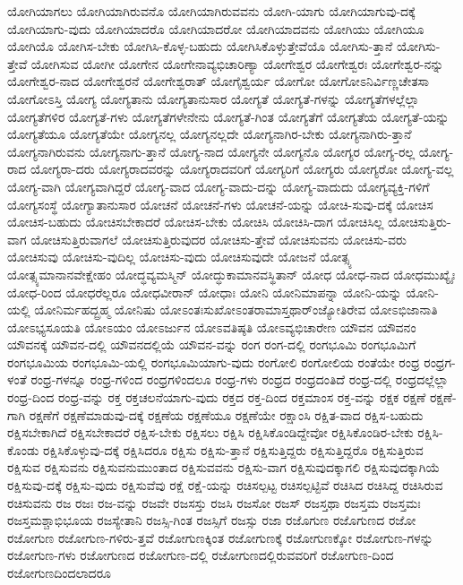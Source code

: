 {ಯೋಗಿಯಾಗಲು
ಯೋಗಿಯಾಗಿರುವನೊ
ಯೋಗಿಯಾಗಿರುವವನು
ಯೋಗಿ-ಯಾಗು
ಯೋಗಿಯಾಗುವು-ದಕ್ಕೆ
ಯೋಗಿಯಾಗು-ವುದು
ಯೋಗಿಯಾದರೊ
ಯೋಗಿಯಾದರೋ
ಯೋಗಿಯಾದವನು
ಯೋಗಿಯು
ಯೋಗಿಯೂ
ಯೋಗಿಯೊ
ಯೋಗಿಸ-ಬೇಕು
ಯೋಗಿಸಿ-ಕೊಳ್ಳ-ಬಹುದು
ಯೋಗಿಸಿಕೊಳ್ಳುತ್ತೇವೆಯೊ
ಯೋಗಿಸು-ತ್ತಾನೆ
ಯೋಗಿಸು-ತ್ತೇವೆ
ಯೋಗಿಸುವ
ಯೋಗೀ
ಯೋಗೇನ
ಯೋಗೇನಾವ್ಯಭಿಚಾರಿಣ್ಯಾ
ಯೋಗೇಶ್ವರ
ಯೋಗೇಶ್ವರಃ
ಯೋಗೇಶ್ವರ-ನನ್ನು
ಯೋಗೇಶ್ವರ-ನಾದ
ಯೋಗೇಶ್ವರನೆ
ಯೋಗೇಶ್ವರಾತ್
ಯೋಗೈಶ್ವರ್ಯ
ಯೋಗೋ
ಯೋಗೋಽನಿರ್ವಿಣ್ಣಚೇತಸಾ
ಯೋಗೋಽಸ್ತಿ
ಯೋಗ್ಯ
ಯೋಗ್ಯತಾನು
ಯೋಗ್ಯತಾನುಸಾರ
ಯೋಗ್ಯತೆ
ಯೋಗ್ಯತೆ-ಗಳನ್ನು
ಯೋಗ್ಯತೆಗಳಲ್ಲೆಲ್ಲಾ
ಯೋಗ್ಯತೆಗಳಿರ
ಯೋಗ್ಯತೆ-ಗಳು
ಯೋಗ್ಯತೆಗಳೇನೇನು
ಯೋಗ್ಯತೆ-ಗಿಂತ
ಯೋಗ್ಯತೆಗೆ
ಯೋಗ್ಯತೆಯ
ಯೋಗ್ಯತೆ-ಯನ್ನು
ಯೋಗ್ಯತೆಯೂ
ಯೋಗ್ಯತೆಯೇ
ಯೋಗ್ಯನಲ್ಲ
ಯೋಗ್ಯನಲ್ಲದೇ
ಯೋಗ್ಯನಾಗಿರ-ಬೇಕು
ಯೋಗ್ಯನಾಗಿರು-ತ್ತಾನೆ
ಯೋಗ್ಯನಾಗಿರುವನು
ಯೋಗ್ಯನಾಗು-ತ್ತಾನೆ
ಯೋಗ್ಯ-ನಾದ
ಯೋಗ್ಯನೇ
ಯೋಗ್ಯನೊ
ಯೋಗ್ಯರ
ಯೋಗ್ಯ-ರಲ್ಲ
ಯೋಗ್ಯ-ರಾದ
ಯೋಗ್ಯರಾ-ದರು
ಯೋಗ್ಯರಾದವರನ್ನು
ಯೋಗ್ಯರಾದವರಿಗೆ
ಯೋಗ್ಯರಿಗೆ
ಯೋಗ್ಯರು
ಯೋಗ್ಯರೋ
ಯೋಗ್ಯ-ವಲ್ಲ
ಯೋಗ್ಯ-ವಾಗಿ
ಯೋಗ್ಯವಾಗಿದ್ದರೆ
ಯೋಗ್ಯ-ವಾದ
ಯೋಗ್ಯ-ವಾದು-ದನ್ನು
ಯೋಗ್ಯ-ವಾದುದು
ಯೋಗ್ಯವ್ಯಕ್ತಿ-ಗಳಿಗೆ
ಯೋಗ್ಯಸಂಸ್ಥೆ
ಯೋಗ್ಯಾತಾನುಸಾರ
ಯೋಚನೆ
ಯೋಚನೆ-ಗಳು
ಯೋಚನೆ-ಯನ್ನು
ಯೋಚಿ-ಸುವು-ದಕ್ಕೆ
ಯೋಚಿಸ
ಯೋಚಿಸ-ಬಹುದು
ಯೋಚಿಸಬೇಕಾದರೆ
ಯೋಚಿಸ-ಬೇಕು
ಯೋಚಿಸಿ
ಯೋಚಿಸಿ-ದಾಗ
ಯೋಚಿಸಿಲ್ಲ
ಯೋಚಿಸುತ್ತಿರು-ವಾಗ
ಯೋಚಿಸುತ್ತಿರುವಾಗಲೆ
ಯೋಚಿಸುತ್ತಿರುವುದರ
ಯೋಚಿಸು-ತ್ತೇವೆ
ಯೋಚಿಸುವನು
ಯೋಚಿಸು-ವರು
ಯೋಚಿಸುವು
ಯೋಚಿಸು-ವುದಿಲ್ಲ
ಯೋಚಿಸು-ವುದು
ಯೋಚಿಸುವುದೇ
ಯೋಜನೆ
ಯೋತ್ಸ್ಯ
ಯೋತ್ಸ್ಯಮಾನಾನವೇಕ್ಷೇಹಂ
ಯೋದ್ಧವ್ಯಮಸ್ಮಿನ್
ಯೋದ್ಧುಕಾಮಾನವಸ್ಥಿತಾನ್
ಯೋಧ
ಯೋಧ-ನಾದ
ಯೋಧಮುಖ್ಯೈಃ
ಯೋಧ-ರಿಂದ
ಯೋಧರೆಲ್ಲರೂ
ಯೋಧವೀರಾನ್
ಯೋಧಾಃ
ಯೋನಿ
ಯೋನಿಮಾಪನ್ನಾ
ಯೋನಿ-ಯನ್ನು
ಯೋನಿ-ಯಲ್ಲಿ
ಯೋನಿರ್ಮಹದ್ಬ್ರಹ್ಮ
ಯೋನಿಷು
ಯೋಽಂತಃಸುಖೋಽಂತರಾಮಾಸ್ತಥಾರ್ಂಜ್ಯೋತಿರೇವ
ಯೋಽಭಿಜಾನಾತಿ
ಯೋಽಭ್ಯಸೂಯತಿ
ಯೋಽಯಂ
ಯೋಽರ್ಜುನ
ಯೋಽವತಿಷ್ಠತಿ
ಯೋಽವ್ಯಭಿಚಾರೇಣ
ಯೌವನ
ಯೌವನಂ
ಯೌವನಕ್ಕೆ
ಯೌವನ-ದಲ್ಲಿ
ಯೌವನದಲ್ಲಿಯೆ
ಯೌವನ-ವನ್ನು
ರಂಗ
ರಂಗ-ದಲ್ಲಿ
ರಂಗಭೂಮಿ
ರಂಗಭೂಮಿಗೆ
ರಂಗಭೂಮಿಯ
ರಂಗಭೂಮಿ-ಯಲ್ಲಿ
ರಂಗಭೂಮಿಯಾಗು-ವುದು
ರಂಗೋಲಿ
ರಂಗೋಲಿಯ
ರಂತೆಯೇ
ರಂಧ್ರ
ರಂಧ್ರಗ-ಳಂತೆ
ರಂಧ್ರ-ಗಳನ್ನೂ
ರಂಧ್ರ-ಗಳಿಂದ
ರಂಧ್ರಗಳಿಂದಲೂ
ರಂಧ್ರ-ಗಳು
ರಂಧ್ರದ
ರಂಧ್ರದಂತಿದೆ
ರಂಧ್ರ-ದಲ್ಲಿ
ರಂಧ್ರದಲ್ಲೆಲ್ಲಾ
ರಂಧ್ರ-ದಿಂದ
ರಂಧ್ರ-ವನ್ನು
ರಕ್ತ
ರಕ್ತಚಲನೆಯಾಗು-ವುದು
ರಕ್ತದ
ರಕ್ತ-ದಿಂದ
ರಕ್ತಮಾಂಸ
ರಕ್ತ-ವನ್ನು
ರಕ್ಷಕ
ರಕ್ಷಣೆ
ರಕ್ಷಣೆ-ಗಾಗಿ
ರಕ್ಷಣೆಗೆ
ರಕ್ಷಣೆಮಾಡುವು-ದಕ್ಕೆ
ರಕ್ಷಣೆಯ
ರಕ್ಷಣೆಯೂ
ರಕ್ಷಣೆಯೇ
ರಕ್ಷಾಂಸಿ
ರಕ್ಷಿತ-ವಾದ
ರಕ್ಷಿಸ-ಬಹುದು
ರಕ್ಷಿಸಬೇಕಾಗಿದೆ
ರಕ್ಷಿಸಬೇಕಾದರೆ
ರಕ್ಷಿಸ-ಬೇಕು
ರಕ್ಷಿಸಲು
ರಕ್ಷಿಸಿ
ರಕ್ಷಿಸಿಕೊಂಡಿದ್ದೇವೋ
ರಕ್ಷಿಸಿಕೊಂಡಿರ-ಬೇಕು
ರಕ್ಷಿಸಿ-ಕೊಂಡು
ರಕ್ಷಿಸಿಕೊಳ್ಳುವು-ದಕ್ಕೆ
ರಕ್ಷಿಸಿದರೂ
ರಕ್ಷಿಸು
ರಕ್ಷಿಸು-ತ್ತಾನೆ
ರಕ್ಷಿಸುತ್ತಿದ್ದರು
ರಕ್ಷಿಸುತ್ತಿದ್ದರೊ
ರಕ್ಷಿಸುತ್ತಿರುವ
ರಕ್ಷಿಸುವ
ರಕ್ಷಿಸುವನು
ರಕ್ಷಿಸುವನುಮುಂತಾದ
ರಕ್ಷಿಸುವವನು
ರಕ್ಷಿಸು-ವಾಗ
ರಕ್ಷಿಸುವುದಕ್ಕಾಗಲಿ
ರಕ್ಷಿಸುವುದಕ್ಕಾಗಿಯೆ
ರಕ್ಷಿಸುವು-ದಕ್ಕೆ
ರಕ್ಷಿಸು-ವುದು
ರಕ್ಷಿಸುವೆವು
ರಕ್ಷೆ
ರಕ್ಷೆ-ಯನ್ನು
ರಚಿಸಲ್ಪಟ್ಟ
ರಚಿಸಲ್ಪಟ್ಟಿವೆ
ರಚಿಸಿದ
ರಚಿಸಿದ್ದ
ರಚಿಸಿರುವ
ರಚಿಸುವನು
ರಜ
ರಜಃ
ರಜ-ವನ್ನು
ರಜವೇ
ರಜಸಸ್ತು
ರಜಸಿ
ರಜಸೋ
ರಜಸ್
ರಜಸ್ತಥಾ
ರಜಸ್ತಮ
ರಜಸ್ತಮಃ
ರಜಸ್ತಮಶ್ಚಾಭಿಭೂಯ
ರಜಸ್ಯೇತಾನಿ
ರಜಸ್ಸಿ-ಗಿಂತ
ರಜಸ್ಸಿಗೆ
ರಜಸ್ಸು
ರಜಾ
ರಜೊಗುಣ
ರಜೊಗುಣದ
ರಜೋ
ರಜೋಗುಣ
ರಜೋಗುಣ-ಗಳಿರು-ತ್ತವೆ
ರಜೋಗುಣಕ್ಕಿಂತ
ರಜೋಗುಣಕ್ಕೆ
ರಜೋಗುಣಕ್ಕೋ
ರಜೋಗುಣ-ಗಳನ್ನು
ರಜೋಗುಣ-ಗಳು
ರಜೋಗುಣದ
ರಜೋಗುಣ-ದಲ್ಲಿ
ರಜೋಗುಣದಲ್ಲಿರುವವರಿಗೆ
ರಜೋಗುಣ-ದಿಂದ
ರಜೋಗುಣದಿಂದಲಾದರೂ
}

